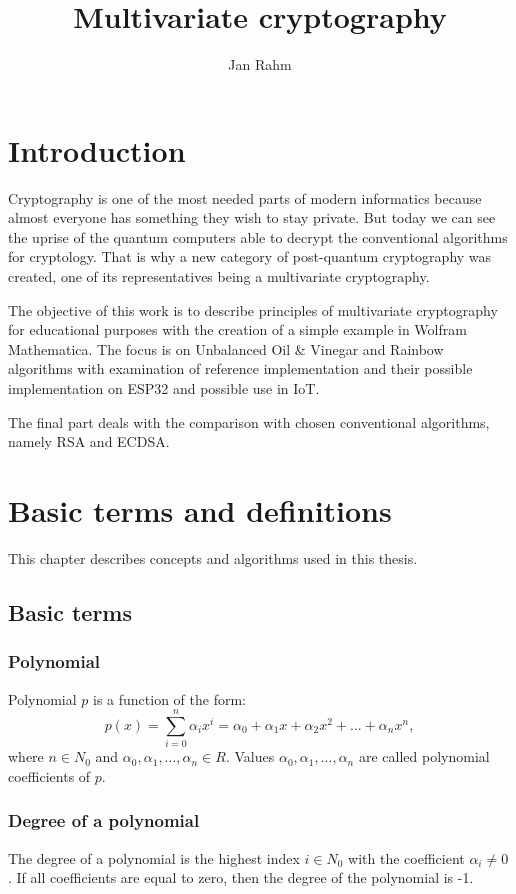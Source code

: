 \documentclass[thesis=M,english]{FITthesis}[2019/12/23]
\title{Multivariate cryptography}
\author{Jan Rahm} %
\begin{document}

\chapter{Introduction}
Cryptography is one of the most needed parts of modern informatics because almost everyone has something they wish to stay private. But today we can see the uprise of the quantum computers able to decrypt the conventional algorithms for cryptology. That is why a new category of post-quantum cryptography was created, one of its representatives being a multivariate cryptography.

The objective of this work is to describe principles of multivariate cryptography for educational purposes with the creation of a simple example in Wolfram Mathematica. The focus is on Unbalanced Oil \& Vinegar and Rainbow algorithms with examination of reference implementation and their possible implementation on ESP32 and possible use in IoT.

The final part deals with the comparison with chosen conventional algorithms, namely RSA and ECDSA. 

\chapter{Basic terms and definitions}
This chapter describes concepts and algorithms used in this thesis.

\section{Basic terms}
\subsection{Polynomial}
Polynomial $p$ is a function of the form:
\[
p(x) = \sum\limits_{i=0}^n {\alpha_ix^i} = \alpha_0 + \alpha_1x + \alpha_2x^2 + ... + \alpha_nx^n,
\]
where $n \in N_0$ and $\alpha_0, \alpha_1, ..., \alpha_n \in R$. Values $\alpha_0, \alpha_1, ..., \alpha_n$ are called polynomial coefficients of $p$.

\subsection{Degree of a polynomial}
The degree of a polynomial is the highest index $i \in N_0$ with the coefficient $\alpha_i \ne 0$. If all coefficients are equal to zero, then the degree of the polynomial is -1.
\end{document}

